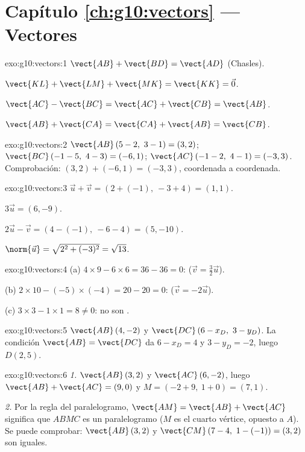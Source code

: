 \section*{Capítulo \ref{ch:g10:vectors} --- Vectores}

\begin{solution}{exo:g10:vectors:1}
$\vect{AB} + \vect{BD} = \vect{AD}$ (Chasles).

$\vect{KL} + \vect{LM} + \vect{MK} = \vect{KK} = \vec 0$.

$\vect{AC} - \vect{BC} = \vect{AC} + \vect{CB} = \vect{AB}$.

$\vect{AB} + \vect{CA} = \vect{CA} + \vect{AB} = \vect{CB}$.
\end{solution}

\begin{solution}{exo:g10:vectors:2}
$\vect{AB}\,(5-2,\ 3-1) = (3, 2)$; \quad
$\vect{BC}\,(-1-5,\ 4-3) = (-6, 1)$; \quad
$\vect{AC}\,(-1-2,\ 4-1) = (-3, 3)$.
Comprobación: $(3, 2) + (-6, 1) = (-3, 3)$, coordenada a coordenada.
\end{solution}

\begin{solution}{exo:g10:vectors:3}
$\vec u + \vec v = (2 + (-1),\ -3 + 4) = (1, 1)$.

$3\vec u = (6, -9)$.

$2\vec u - \vec v = (4 - (-1),\ -6 - 4) = (5, -10)$.

$\norm{\vec u} = \sqrt{2^2 + (-3)^2} = \sqrt{13}$.
\end{solution}

\begin{solution}{exo:g10:vectors:4}
(a) $4 \times 9 - 6 \times 6 = 36 - 36 = 0$: 
($\vec v = \frac32 \vec u$).

(b) $2 \times 10 - (-5) \times (-4) = 20 - 20 = 0$: 
($\vec v = -2\vec u$).

(c) $3 \times 3 - 1 \times 1 = 8 \neq 0$: no son .
\end{solution}

\begin{solution}{exo:g10:vectors:5}
$\vect{AB}\,(4, -2)$ y $\vect{DC}\,(6 - x_D,\ 3 - y_D)$. La condición
$\vect{AB} = \vect{DC}$ da $6 - x_D = 4$ y $3 - y_D = -2$, luego
$D(2, 5)$.
\end{solution}

\begin{solution}{exo:g10:vectors:6}
\emph{1.} $\vect{AB}\,(3, 2)$ y $\vect{AC}\,(6, -2)$, luego
$\vect{AB} + \vect{AC} = (9, 0)$ y $M = (-2 + 9,\ 1 + 0) = (7, 1)$.

\emph{2.} Por la regla del paralelogramo, $\vect{AM} = \vect{AB} +
\vect{AC}$ significa que $ABMC$ es un paralelogramo ($M$ es el cuarto
vértice, opuesto a $A$). Se puede comprobar: $\vect{AB}\,(3,2)$ y
$\vect{CM}\,(7-4,\ 1-(-1)) = (3, 2)$ son iguales.
\end{solution}

